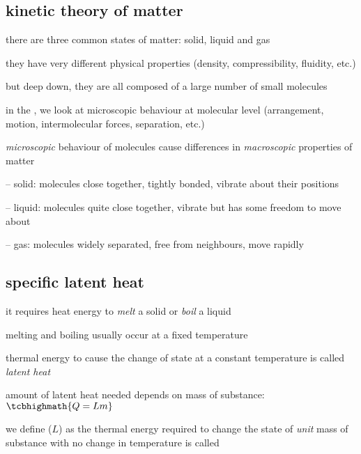 \subsection{kinetic theory of matter}

there are three common states of matter: solid, liquid and gas

they have very different physical properties (density, compressibility, fluidity, etc.)

but deep down, they are all composed of a large number of small molecules

in the , we look at microscopic behaviour at molecular level (arrangement, motion, intermolecular forces, separation, etc.)

\emph{microscopic} behaviour of molecules cause differences in \emph{macroscopic} properties of matter

\begin{compactitem}
	\item[--] solid: molecules close together, tightly bonded, vibrate about their positions
	
	\item[--] liquid: molecules quite close together, vibrate but has some freedom to move about
	
	\item[--] gas: molecules widely separated, free from neighbours, move rapidly
\end{compactitem}

\subsection{specific latent heat}

it requires heat energy to \emph{melt} a solid or \emph{boil} a liquid

melting and boiling usually occur at a fixed temperature

thermal energy to cause the change of state at a constant temperature is called \emph{latent heat}

amount of latent heat needed depends on mass of substance: $\tcbhighmath{Q=Lm}$

\begin{ilight}
	we define  ($L$) as the thermal energy required to change the state of \emph{unit} mass of substance with no change in temperature is called 
\end{ilight}



